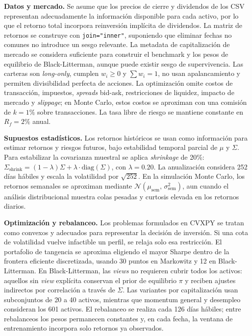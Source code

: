 \textbf{Datos y mercado.} Se asume que los precios de cierre y dividendos de los CSV representan adecuadamente la informaci\'on disponible para cada activo, por lo que el retorno total incorpora reinversi\'on impl\'icita de dividendos. La matriz de retornos se construye con \texttt{join="inner"}, suponiendo que eliminar fechas no comunes no introduce un sesgo relevante. La metadata de capitalizaci\'on de mercado se considera suficiente para construir el benchmark y los pesos de equilibrio de Black-Litterman, aunque puede existir sesgo de supervivencia. Las carteras son \textit{long-only}, cumplen $w_i \geq 0$ y $\sum w_i = 1$, no usan apalancamiento y permiten divisibilidad perfecta de acciones. La optimizaci\'on omite costos de transacci\'on, impuestos, \textit{spreads} bid-ask, restricciones de liquidez, impacto de mercado y \textit{slippage}; en Monte Carlo, estos costos se aproximan con una comisi\'on de $k = 1\%$ sobre transacciones. La tasa libre de riesgo se mantiene constante en $R_f = 2\%$ anual.

\textbf{Supuestos estad\'isticos.} Los retornos hist\'oricos se usan como informaci\'on para estimar retornos y riesgos futuros, bajo estabilidad temporal parcial de $\mu$ y $\Sigma$. Para estabilizar la covarianza muestral se aplica \textit{shrinkage} de 20\%: $\Sigma_{\text{shrink}} = (1-\lambda)\Sigma + \lambda \cdot \text{diag}(\Sigma)$, con $\lambda = 0.20$. La anualizaci\'on considera 252 d\'ias h\'abiles y escala la volatilidad por $\sqrt{252}$. En la simulaci\'on Monte Carlo, los retornos semanales se aproximan mediante $\mathcal{N}(\mu_{\text{sem}},\, \sigma_{\text{sem}}^2)$, aun cuando el an\'alisis distribucional muestra colas pesadas y curtosis elevada en los retornos diarios.

\textbf{Optimizaci\'on y rebalanceo.} Los problemas formulados en CVXPY se tratan como convexos y adecuados para representar la decisi\'on de inversi\'on. Si una cota de volatilidad vuelve infactible un perfil, se relaja solo esa restricci\'on. El portafolio de tangencia se aproxima eligiendo el mayor Sharpe dentro de la frontera eficiente discretizada, usando 30 puntos en Markowitz y 12 en Black-Litterman. En Black-Litterman, las \textit{views} no requieren cubrir todos los activos: aquellos sin \textit{view} expl\'icita conservan el prior de equilibrio $\pi$ y reciben ajustes indirectos por correlaci\'on a trav\'es de $\Sigma$. Las variantes por capitalizaci\'on usan subconjuntos de 20 a 40 activos, mientras que momentum general y desempleo consideran los 601 activos. El rebalanceo se realiza cada 126 d\'ias h\'abiles; entre rebalanceos los pesos permanecen constantes y, en cada fecha, la ventana de entrenamiento incorpora solo retornos ya observados.

